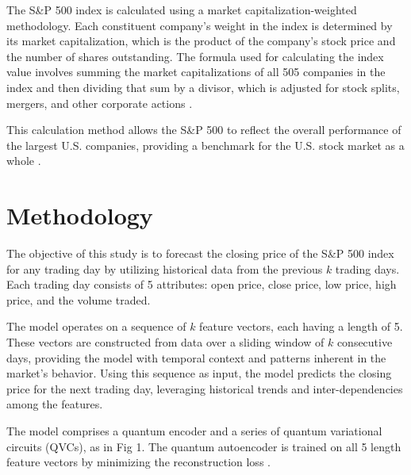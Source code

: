 \documentclass[conference]{IEEEtran}
\begin{document}
The S\&P 500 index is calculated using a market capitalization-weighted methodology. Each constituent company’s weight in the index is determined by its market capitalization, which is the product of the company’s stock price and the number of shares outstanding. The formula used for calculating the index value involves summing the market capitalizations of all 505 companies in the index and then dividing that sum by a divisor, which is adjusted for stock splits, mergers, and other corporate actions \cite{b15}. 

This calculation method allows the S\&P 500 to reflect the overall performance of the largest U.S. companies, providing a benchmark for the U.S. stock market as a whole \cite{b16}.

\section{Methodology}
The objective of this study is to forecast the closing price of the S\&P 500 index for any trading day by utilizing historical data from the previous $k$ trading days. Each trading day consists of 5 attributes: open price, close price, low price, high price, and the volume traded.

The model operates on a sequence of $k$ feature vectors, each having a length of 5. These vectors are constructed from data over a sliding window of $k$ consecutive days, providing the model with temporal context and patterns inherent in the market's behavior. Using this sequence as input, the model predicts the closing price for the next trading day, leveraging historical trends and inter-dependencies among the features.

The model comprises a quantum encoder and a series of quantum variational circuits (QVCs), as in Fig 1. The quantum autoencoder is trained on all 5 length feature vectors by minimizing the reconstruction loss \cite{b17}.
\end{document}
